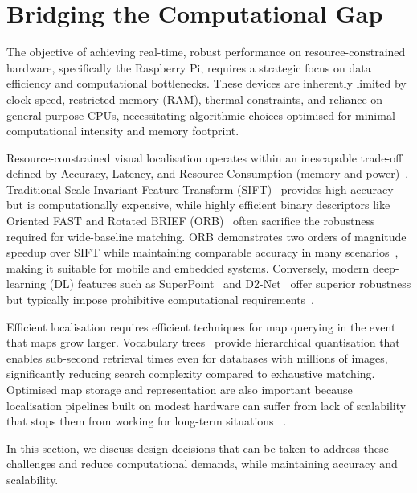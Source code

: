 \documentclass[12pt]{article}
\begin{document}
\section{Bridging the Computational Gap}


The objective of achieving real-time, robust performance on resource-constrained hardware, specifically the Raspberry Pi, requires a strategic focus on data efficiency and computational bottlenecks. These devices are inherently limited by clock speed, restricted memory (RAM), thermal constraints, and reliance on general-purpose CPUs, necessitating algorithmic choices optimised for minimal computational intensity and memory footprint. 

Resource-constrained visual localisation operates within an inescapable trade-off defined by Accuracy, Latency, and Resource Consumption (memory and power)~\cite{benali2022edge}. Traditional Scale-Invariant Feature Transform (SIFT)~\cite{loweDistinctiveImageFeatures2004} provides high accuracy but is computationally expensive, while highly efficient binary descriptors like Oriented FAST and Rotated BRIEF (ORB)~\cite{rubleeORBEfficientAlternative2011} often sacrifice the robustness required for wide-baseline matching. ORB demonstrates two orders of magnitude speedup over SIFT while maintaining comparable accuracy in many scenarios~\cite{rubleeORBEfficientAlternative2011}, making it suitable for mobile and embedded systems. Conversely, modern deep-learning (DL) features such as SuperPoint~\cite{detoneSuperPointSelfSupervisedInterest2018} and D2-Net~\cite{dusmanuD2NetTrainableCNN2019} offer superior robustness but typically impose prohibitive computational requirements~\cite{lim2025lightweight}. 

Efficient localisation requires efficient techniques for map querying in the event that maps grow larger. Vocabulary trees~\cite{nister2006scalable} provide hierarchical quantisation that enables sub-second retrieval times even for databases with millions of images, significantly reducing search complexity compared to exhaustive matching. Optimised map storage and representation are also important because localisation pipelines built on modest hardware can suffer from lack of scalability that stops them from working for long-term situations ~\cite{benali2022edge}.

In this section, we discuss design decisions that can be taken to address these challenges and reduce computational demands, while maintaining accuracy and scalability.
\end{document}
